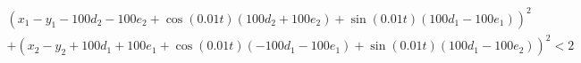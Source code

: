 \begin{multline*}
(x_1 - y_1 - 100 d_2 - 100 e_2 + \cos(0.01 t) (100 d_2 + 100 e_2) + \sin(0.01 t) (100 d_1 - 100 e_1)) ^ 2\\
+ (x_2 - y_2 + 100 d_1 + 100 e_1 + \cos(0.01 t) (-100d_1 -100e_1) + \sin(0.01 t) (100 d_1 - 100 e_2)) ^ 2 < 2
\end{multline*}
